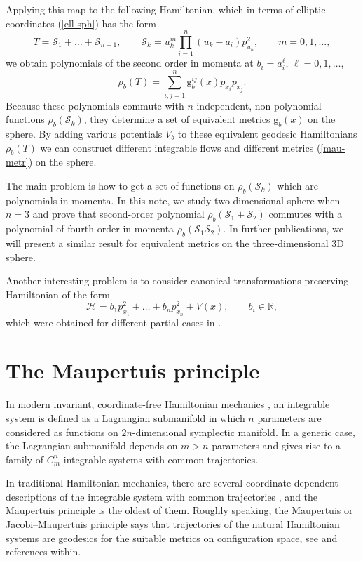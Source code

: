 \documentclass[10pt,a4paper]{amsart}
\numberwithin{equation}{section}
\begin{document}
Applying this map to the following Hamiltonian, which in terms of elliptic coordinates (\ref{ell-sph}) has the form
\[
T=\mathcal S_1+\dots+\mathcal S_{n-1} ,\qquad \mathcal S_k=u_k^m\prod_{i=1}^n (u_k-a_i)p_{u_k}^2 ,\qquad m=0,1,\dots ,
\]
we obtain polynomials of the second order in momenta at $b_i=a_i^\ell$, $\ell=0,1,\dots$,
\[\rho_b(T)=\sum_{i,j=1}^n \mathrm g^{ij}_b(x) p_{x_i} p_{x_j} .\]
Because these polynomials commute with $n$ independent, non-polynomial functions $\rho_b(\mathcal S_k)$, they determine a set of equivalent metrics $\mathrm g_b(x)$ on the sphere. By adding various potentials $V_b$ to these equivalent geodesic Hamiltonians $\rho_b(T)$ we can construct different integrable flows and different metrics (\ref{mau-metr}) on the sphere.

 The main problem is how to get a set of functions on $\rho_b(\mathcal S_k)$ which are polynomials in momenta. In this note, we study two-dimensional sphere when $n=3$ and prove that second-order polynomial $\rho_b(\mathcal S_1+\mathcal S_2)$ commutes with a polynomial of fourth order in momenta $\rho_b(\mathcal S_1\mathcal S_2)$. In further publications, we will present a similar result for equivalent metrics on the three-dimensional 3D sphere.

 Another interesting problem is to consider canonical transformations preserving Hamiltonian of the form
 \[
\mathcal H=b_1p_{x_1}^2+\dots+ b_np_{x_n}^2+V(x) ,\qquad b_i\in\mathbb R ,
\]
which were obtained for different partial cases in \cite{ts15,ts15a,ts17ell,ts17v, ts17c}.

\appendix

\section{The Maupertuis principle}
 In modern invariant, coordinate-free Hamiltonian mechanics \cite{arn,kup77}, an integrable system is defined as a Lagrangian submanifold in which $n$ parameters are considered as functions on $2n$-dimensional symplectic manifold. In a generic case, the Lagrangian submanifold depends on $m>n$ parameters and gives rise to a family of $C^n_m$ integrable systems with common trajectories.

 In traditional Hamiltonian mechanics, there are several coordinate-dependent descriptions of the integrable system with common trajectories \cite{bl12}, and the Maupertuis principle is the oldest of them. Roughly speaking, the Maupertuis or Jacobi--Maupertuis principle says that trajectories of the natural Hamiltonian systems are geodesics for the suitable metrics on configuration space, see \cite{bf05,bol95,ts99, ts01} and references within.
\end{document}
